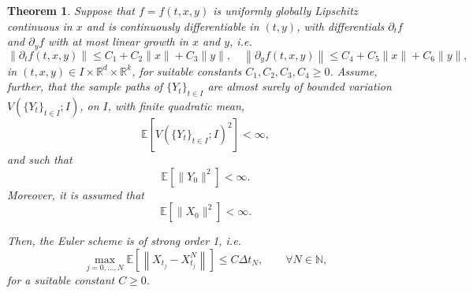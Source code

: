 \documentclass[reqno,12pt]{amsart}
\theoremstyle{plain} %
\newtheorem{theorem}{Theorem}[section]
\theoremstyle{definition} %
\begin{document}
\begin{theorem}
    \label{thmdiffmonotonicbound}
    Suppose that $f=f(t, x, y)$ is uniformly globally Lipschitz continuous in $x$ and is continuously differentiable in $(t, y)$, with differentials $\partial_t f$ and $\partial_y f$ with at most linear growth in $x$ and $y$, i.e.
    \begin{equation}
        \label{ftfylineargrowth}
        \left\|\partial_t f(t, x, y)\right\| \leq C_1 + C_2 \|x\| + C_3\|y\|, \quad \left\|\partial_y f(t, x, y)\right\| \leq C_4 + C_5\|x\| + C_6\|y\|,
    \end{equation}
    in $(t, x, y)\in I\times \mathbb{R}^d\times \mathbb{R}^k$, for suitable constants $C_1, C_2, C_3, C_4 \geq 0$.
    Assume, further, that the sample paths of $\{Y_t\}_{t\in I}$ are almost surely of bounded variation $V(\{Y_t\}_{t\in I}; I)$, on $I$, with finite quadratic mean,
    \begin{equation}
        \label{EYtboundedsquarevariation2}
        \mathbb{E}[V(\{Y_t\}_{t\in I}; I)^2] < \infty,
    \end{equation}
    and such that
    \begin{equation}
        \label{EY0square2}
        \mathbb{E}[\|Y_0\|^2] < \infty.
    \end{equation}
    Moreover, it is assumed that
    \begin{equation}
        \label{EX0square2}
        \mathbb{E}[\|X_0\|^2] < \infty.
    \end{equation}

    Then, the Euler scheme is of strong order 1, i.e.
    \begin{equation}
        \max_{j=0, \ldots, N}\mathbb{E}\left[ \left\| X_{t_j} - X_{t_j}^N \right\| \right] \leq C \Delta t_N, \qquad \forall N \in \mathbb{N},
    \end{equation}
    for a suitable constant $C \geq 0$.
\end{theorem}
\end{document}
